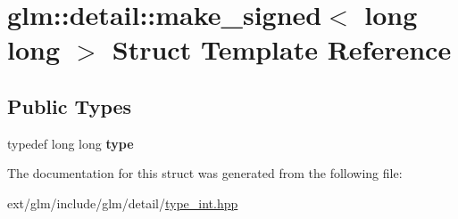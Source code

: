\hypertarget{structglm_1_1detail_1_1make__signed_3_01long_01long_01_4}{\section{glm\-:\-:detail\-:\-:make\-\_\-signed$<$ long long $>$ Struct Template Reference}
\label{structglm_1_1detail_1_1make__signed_3_01long_01long_01_4}
}
\subsection*{Public Types}
\begin{DoxyCompactItemize}
\item 
\hypertarget{structglm_1_1detail_1_1make__signed_3_01long_01long_01_4_a109303fc9f5838a2843711c023a57bc8}{typedef long long {\bfseries type}}\label{structglm_1_1detail_1_1make__signed_3_01long_01long_01_4_a109303fc9f5838a2843711c023a57bc8}

\end{DoxyCompactItemize}


The documentation for this struct was generated from the following file\-:\begin{DoxyCompactItemize}
\item 
ext/glm/include/glm/detail/\hyperlink{type__int_8hpp}{type\-\_\-int.\-hpp}\end{DoxyCompactItemize}
